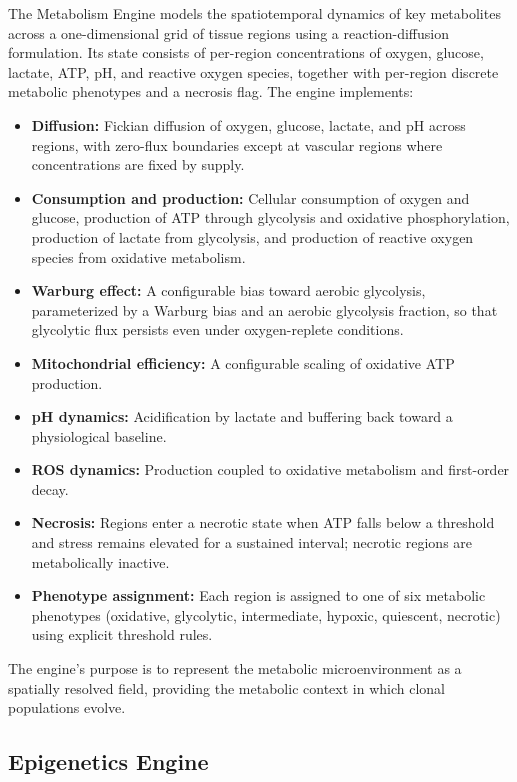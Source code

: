 \documentclass[12pt,a4paper]{article}
\begin{document}
The Metabolism Engine models the spatiotemporal dynamics of key metabolites across a one-dimensional grid of tissue regions using a reaction-diffusion formulation. Its state consists of per-region concentrations of oxygen, glucose, lactate, ATP, pH, and reactive oxygen species, together with per-region discrete metabolic phenotypes and a necrosis flag. The engine implements:

\begin{itemize}[leftmargin=*]
    \item \textbf{Diffusion:} Fickian diffusion of oxygen, glucose, lactate, and pH across regions, with zero-flux boundaries except at vascular regions where concentrations are fixed by supply.
    \item \textbf{Consumption and production:} Cellular consumption of oxygen and glucose, production of ATP through glycolysis and oxidative phosphorylation, production of lactate from glycolysis, and production of reactive oxygen species from oxidative metabolism.
    \item \textbf{Warburg effect:} A configurable bias toward aerobic glycolysis, parameterized by a Warburg bias and an aerobic glycolysis fraction, so that glycolytic flux persists even under oxygen-replete conditions.
    \item \textbf{Mitochondrial efficiency:} A configurable scaling of oxidative ATP production.
    \item \textbf{pH dynamics:} Acidification by lactate and buffering back toward a physiological baseline.
    \item \textbf{ROS dynamics:} Production coupled to oxidative metabolism and first-order decay.
    \item \textbf{Necrosis:} Regions enter a necrotic state when ATP falls below a threshold and stress remains elevated for a sustained interval; necrotic regions are metabolically inactive.
    \item \textbf{Phenotype assignment:} Each region is assigned to one of six metabolic phenotypes (oxidative, glycolytic, intermediate, hypoxic, quiescent, necrotic) using explicit threshold rules.
\end{itemize}

The engine's purpose is to represent the metabolic microenvironment as a spatially resolved field, providing the metabolic context in which clonal populations evolve.

\subsection{Epigenetics Engine}
\end{document}
